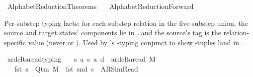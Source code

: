 %
\begin{isabellebody}%
%
%
\isadelimtheory
%
\endisadelimtheory
%
\isatagtheory
{}\isamarkupfalse%
\ AlphabetReduction{\isacharunderscore}{\kern0pt}Theorems\isanewline
\ \ \ AlphabetReduction{\isacharunderscore}{\kern0pt}Forward\isanewline
{}%
\endisatagtheory
{\isafoldtheory}%
%
\isadelimtheory
%
\endisadelimtheory
%
\isadelimdocument
%
\endisadelimdocument
%
\isatagdocument
%
\isamarkuptrue%
%
\endisatagdocument
{\isafolddocument}%
%
\isadelimdocument
%
\endisadelimdocument
%
\begin{isamarkuptext}%
Per-substep typing facts: for each substep relation in
  the five-substep union, the source and target states' 
  components lie in , and the source's
   tag is the relation-specific value
  (never  or ).
  Used by 's \isa{{\isasymdelta}{\isacharprime}{\kern0pt}}-typing
  conjunct to show \isa{{\isasymdelta}{\isacharprime}{\kern0pt}}-tuples land in
  .%
\end{isamarkuptext}\isamarkuptrue%
\isamarkupfalse%
\ ar{\isacharunderscore}{\kern0pt}delta{\isacharunderscore}{\kern0pt}read{\isacharunderscore}{\kern0pt}typing{\isacharcolon}{\kern0pt}\isanewline
\ \ \ {\isachardoublequoteopen}{\isacharparenleft}{\kern0pt}s{\isacharcomma}{\kern0pt}\ a{\isacharcomma}{\kern0pt}\ s{\isacharprime}{\kern0pt}{\isacharcomma}{\kern0pt}\ a{\isacharprime}{\kern0pt}{\isacharcomma}{\kern0pt}\ d{\isacharparenright}{\kern0pt}\ {\isasymin}\ ar{\isacharunderscore}{\kern0pt}delta{\isacharunderscore}{\kern0pt}read\ M{\isachardoublequoteclose}\isanewline
\ \ \ {\isachardoublequoteopen}fst\ s\ {\isasymin}\ Q{\isacharunderscore}{\kern0pt}tm\ M\ {\isasymand}\ fst\ {\isacharparenleft}{\kern0pt}snd\ s{\isacharparenright}{\kern0pt}\ {\isacharequal}{\kern0pt}\ AR{\isacharunderscore}{\kern0pt}SimRead\isanewline

\end{isabellebody}
